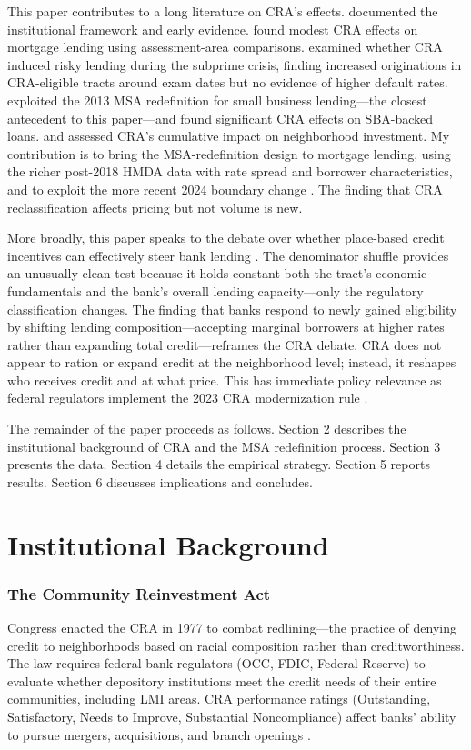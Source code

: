 \documentclass[12pt]{article}
\begin{document}
This paper contributes to a long literature on CRA's effects. \citet{avery2003community} documented the institutional framework and early evidence. \citet{bhutta2011community} found modest CRA effects on mortgage lending using assessment-area comparisons. \citet{agarwal2012did} examined whether CRA induced risky lending during the subprime crisis, finding increased originations in CRA-eligible tracts around exam dates but no evidence of higher default rates. \citet{ding2020effects} exploited the 2013 MSA redefinition for small business lending---the closest antecedent to this paper---and found significant CRA effects on SBA-backed loans. \citet{gabriel2020community} and \citet{lee2012banks} assessed CRA's cumulative impact on neighborhood investment. My contribution is to bring the MSA-redefinition design to mortgage lending, using the richer post-2018 HMDA data with rate spread and borrower characteristics, and to exploit the more recent 2024 boundary change \citep{omb2023}. The finding that CRA reclassification affects pricing but not volume is new.

More broadly, this paper speaks to the debate over whether place-based credit incentives can effectively steer bank lending \citep{barr2005credit}. The denominator shuffle provides an unusually clean test because it holds constant both the tract's economic fundamentals and the bank's overall lending capacity---only the regulatory classification changes. The finding that banks respond to newly gained eligibility by shifting lending composition---accepting marginal borrowers at higher rates rather than expanding total credit---reframes the CRA debate. CRA does not appear to ration or expand credit at the neighborhood level; instead, it reshapes who receives credit and at what price. This has immediate policy relevance as federal regulators implement the 2023 CRA modernization rule \citep{harvey2024cra}.

The remainder of the paper proceeds as follows. Section 2 describes the institutional background of CRA and the MSA redefinition process. Section 3 presents the data. Section 4 details the empirical strategy. Section 5 reports results. Section 6 discusses implications and concludes.

\section{Institutional Background}

\subsubsection*{The Community Reinvestment Act} Congress enacted the CRA in 1977 to combat redlining---the practice of denying credit to neighborhoods based on racial composition rather than creditworthiness. The law requires federal bank regulators (OCC, FDIC, Federal Reserve) to evaluate whether depository institutions meet the credit needs of their entire communities, including LMI areas. CRA performance ratings (Outstanding, Satisfactory, Needs to Improve, Substantial Noncompliance) affect banks' ability to pursue mergers, acquisitions, and branch openings \citep{barr2005credit}.
\end{document}
